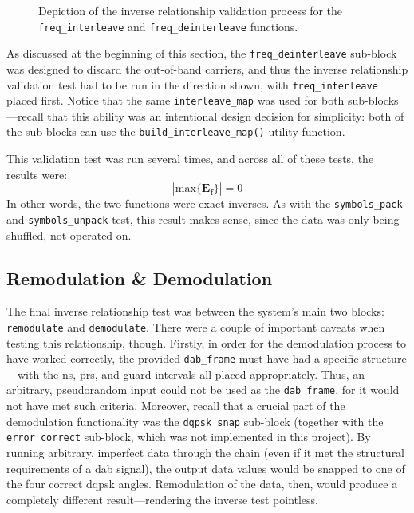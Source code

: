 \documentclass[class=report,11pt,crop=false]{standalone}
\begin{document}
\begin{figure}[htbp]
  \centering
  \captionsetup{type=figure}
  \def\svgwidth{\linewidth}
  { %
      }
  \caption{Depiction of the inverse relationship validation process for the \texttt{freq\_interleave} and \texttt{freq\_deinterleave} functions.}
  \label{fig:inverse-freq-interleave-deinterleave}
\end{figure}

As discussed at the beginning of this section, the \texttt{freq\_deinterleave} sub-block was designed to discard the out-of-band carriers, and thus the inverse relationship validation test had to be run in the direction shown, with \texttt{freq\_interleave} placed first. Notice that the same \texttt{interleave\_map} was used for both sub-blocks---recall that this ability was an intentional design decision for simplicity: both of the sub-blocks can use the \texttt{build\_interleave\_map()} utility function.

This validation test was run several times, and across all of these tests, the results were:
\begin{equation}
  \left| \mathrm{max} \{ \mathbf{E_f} \} \right| = 0
\end{equation}
In other words, the two functions were exact inverses. As with the \texttt{symbols\_pack} and \texttt{symbols\_unpack} test, this result makes sense, since the data was only being shuffled, not operated on. 

\subsection{Remodulation \& Demodulation}
The final inverse relationship test was between the system's main two blocks: \texttt{remodulate} and \texttt{demodulate}. There were a couple of important caveats when testing this relationship, though. Firstly, in order for the demodulation process to have worked correctly, the provided \texttt{dab\_frame} must have had a specific structure---with the \gls{ns}, \gls{prs}, and guard intervals all placed appropriately. Thus, an arbitrary, pseudorandom input could not be used as the \texttt{dab\_frame}, for it would not have met such criteria. Moreover, recall that a crucial part of the demodulation functionality was the \texttt{dqpsk\_snap} sub-block (together with the \texttt{error\_correct} sub-block, which was not implemented in this project). By running arbitrary, imperfect data through the chain (even if it met the structural requirements of a \gls{dab} signal), the output data values would be snapped to one of the four correct \gls{dqpsk} angles. Remodulation of the data, then, would produce a completely different result---rendering the inverse test pointless.
\end{document}
